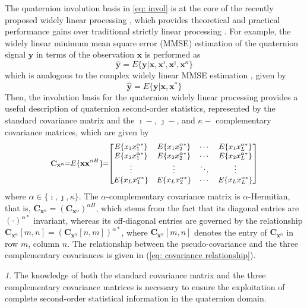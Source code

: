 \documentclass[review]{elsarticle}
\theoremstyle{plain}
\theoremstyle{remark}
\newtheorem{rem}{\protect\remarkname}
\theoremstyle{plain}
\theoremstyle{definition}
\theoremstyle{prop}
\theoremstyle{definition}
\theoremstyle{plain}
\theoremstyle{plain}
\providecommand{\remarkname}{Remark}
\begin{document}
The quaternion involution basis in \eqref{eq: invol} is at the core of the recently proposed widely linear processing \cite{Via2010,CheongTook2010}, which provides theoretical and practical performance gains over traditional strictly linear processing \cite{Xia2015a}. For example, the widely linear minimum mean square error (MMSE) estimation of the quaternion signal $\mathbf{y}$ in terms of the observation $\mathbf{x}$ is performed as
\begin{equation}\label{WL}
\mathbf{\hat{y}}=E\{\mathbf{y}|\mathbf{x},\mathbf{x}^\imath,\mathbf{x}^\jmath,\mathbf{x}^\kappa\}
\end{equation}
which is analogous to the complex widely linear MMSE estimation \cite{Mandic2009}, given by
\[
\mathbf{\hat{y}}=E\{\mathbf{y}|\mathbf{x},\mathbf{x}^*\}
\]
Then, the involution basis for the quaternion widely linear processing provides a useful description of quaternion second-order statistics, represented by the standard covariance matrix and the $\imath-$, $\jmath-$, and $\kappa-$ complementary covariance matrices, which are given by \cite{CheongTook2011b}
\begin{equation}
{\small
\begin{split}
\mathbf{C}_{\mathbf{x}^\alpha}\!\!=\!\!E\{\mathbf{x}\mathbf{x}^{\alpha H}\}\!\!=\!\!\begin{bmatrix}
E\{x_1x_1^{\alpha *}\} & E\{x_1x_2^{\alpha *}\} & \cdots & E\{x_1x_L^{\alpha *}\}\\
E\{x_2x_1^{\alpha *}\} & E\{x_2x_2^{\alpha *}\} & \cdots & E\{x_2x_L^{\alpha *}\} \\
\vdots & \vdots & \ddots & \vdots  \\
E\{x_Lx_1^{\alpha *}\} & E\{x_Lx_2^{\alpha *}\} & \cdots & E\{x_Lx_L^{\alpha *}\}
\end{bmatrix} 
\end{split}}
\end{equation}
where $\alpha\in\{\imath,\jmath,\kappa\}$. The $\alpha$-complementary covariance matrix is $\alpha$-Hermitian, that is, $\mathbf{C}_{\mathbf{x}^\alpha}=(\mathbf{C}_{\mathbf{x}^\alpha})^{\alpha H}$, which stems from the fact that its diagonal entries are $(\cdot)^{\alpha *}$ invariant, whereas its off-diagonal entries are governed by the relationship $\mathbf{C}_{\mathbf{x}^\alpha}[m,n]=(\mathbf{C}_{\mathbf{x}^\alpha}[n,m])^{\alpha *}$, where $\mathbf{C}_{\mathbf{x}^\alpha}[m,n]$ denotes the entry of $\mathbf{C}_{\mathbf{x}^\alpha}$ in row $m$, column $n$.
The relationship between the pseudo-covariance and the three complementary covariances is given in (\ref{eq: covariance relationship}).
\begin{rem}
The knowledge of both the standard covariance matrix and the three complementary covariance matrices is necessary to ensure the exploitation of complete second-order statistical information in the quaternion domain.
\end{rem}
\end{document}
